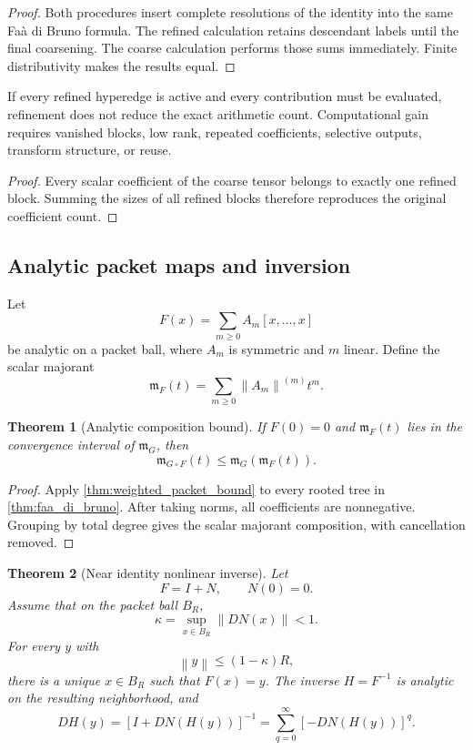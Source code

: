 \documentclass{aomart}
\newtheorem{theorem}{Theorem}[section]
\theoremstyle{definition}
\theoremstyle{remark}
\newcommand{\norm}[1]{\left\lVert#1\right\rVert}
\begin{document}
\begin{proof}
Both procedures insert complete resolutions of the identity into the same Faà di Bruno formula. The refined calculation retains descendant labels until the final coarsening. The coarse calculation performs those sums immediately. Finite distributivity makes the results equal.
\end{proof}

\begin{proposition}\label{prop:no_free_refinement}
If every refined hyperedge is active and every contribution must be evaluated, refinement does not reduce the exact arithmetic count. Computational gain requires vanished blocks, low rank, repeated coefficients, selective outputs, transform structure, or reuse.
\end{proposition}

\begin{proof}
Every scalar coefficient of the coarse tensor belongs to exactly one refined block. Summing the sizes of all refined blocks therefore reproduces the original coefficient count.
\end{proof}

\subsection{Analytic packet maps and inversion}

Let
\[
 F(x)=\sum_{m\ge0}A_m[x,\ldots,x]
\]
be analytic on a packet ball, where \(A_m\) is symmetric and \(m\) linear. Define the scalar majorant
\[
 \mathfrak m_F(t)
 =
 \sum_{m\ge0}\norm{A_m}^{(m)}t^m.
\]

\begin{theorem}[Analytic composition bound]\label{thm:analytic_composition}
If \(F(0)=0\) and \(\mathfrak m_F(t)\) lies in the convergence interval of \(\mathfrak m_G\), then
\[
 \boxed{
 \mathfrak m_{G\circ F}(t)
 \le
 \mathfrak m_G(\mathfrak m_F(t)).
 }
\]
\end{theorem}

\begin{proof}
Apply \cref{thm:weighted_packet_bound} to every rooted tree in \cref{thm:faa_di_bruno}. After taking norms, all coefficients are nonnegative. Grouping by total degree gives the scalar majorant composition, with cancellation removed.
\end{proof}

\begin{theorem}[Near identity nonlinear inverse]\label{thm:near_identity_inverse}
Let
\[
 F=I+N,
 \qquad
 N(0)=0.
\]
Assume that on the packet ball \(B_R\),
\[
 \kappa
 =
 \sup_{x\in B_R}\norm{DN(x)}<1.
\]
For every \(y\) with
\[
 \norm{y}\le(1-\kappa)R,
\]
there is a unique \(x\in B_R\) such that \(F(x)=y\). The inverse \(H=F^{-1}\) is analytic on the resulting neighborhood, and
\[
 DH(y)
 =
 [I+DN(H(y))]^{-1}
 =
 \sum_{q=0}^{\infty}[-DN(H(y))]^q.
\]
\end{theorem}
\end{document}
